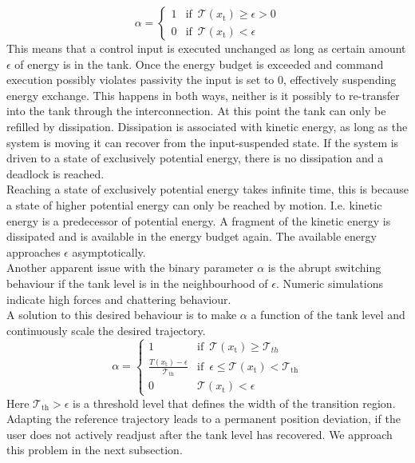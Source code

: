 \documentclass[a4paper,twoside, openright,12pt]{report}
\newcommand{\g}[1]{\text{#1}}
\begin{document}
{\begin{equation}
\alpha = \begin{cases}
1 & \text{if } \, \mathcal{T}(x_\g{t})\geq\epsilon>0 \\
0 & \text{if } \, \mathcal{T}(x_\g{t}) < \epsilon
\end{cases}
\end{equation}
This means that a control input is executed unchanged as long as certain amount $\epsilon$ of energy is in the tank. Once the energy budget is exceeded and command execution possibly violates passivity the input is set to $0$, effectively suspending energy exchange. This happens in both ways, neither is it possibly to re-transfer into the tank through the interconnection. At this point the tank can only be refilled by dissipation. Dissipation is associated with kinetic energy, as long as the system is moving it can recover from the input-suspended state. If the system is driven to a state of exclusively potential energy, there is no dissipation and a deadlock is reached.\\
Reaching a state of exclusively potential energy takes infinite time, this is because a state of higher potential energy can only be reached by motion. I.e. kinetic energy is a predecessor of potential energy. A fragment of the kinetic energy is dissipated and is available in the energy budget again. The available energy approaches $\epsilon$ asymptotically.\\
Another apparent issue with the binary parameter $\alpha$ is the abrupt switching behaviour if the tank level is in the neighbourhood of $\epsilon$. Numeric simulations indicate high forces and chattering behaviour.\\
A solution to this desired behaviour is to make $\alpha$ a function of the tank level and continuously scale the desired trajectory.
\begin{equation}
\alpha = \begin{cases}
1 & \text{if } \, \mathcal{T}(x_\g{t})\geq \mathcal{T}_{th} \\
\frac{T(x_\g{t})-\epsilon}{\mathcal{T}_{\g{th}}} & \text{if } \, \epsilon \leq \mathcal{T}(x_\g{t}) < \mathcal{T}_{\g{th}} \\
0 & \mathcal{T}(x_\g{t}) < \epsilon
\end{cases}
\end{equation}
Here $\mathcal{T}_{\g{th}} > \epsilon$ is a threshold level that defines the width of the transition region. Adapting the reference trajectory leads to a permanent position deviation, if the user does not actively readjust after the tank level has recovered. We approach this problem in the next subsection.\\ 
}
\end{document}
